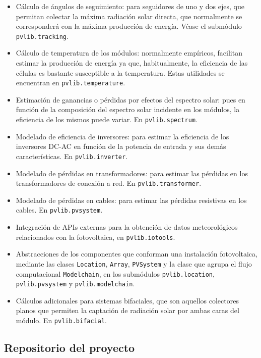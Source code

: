 \begin{itemize}
      \item Cálculo de ángulos de seguimiento: para seguidores de uno y dos ejes, que permitan colectar la máxima radiación solar directa, que normalmente se corresponderá con la máxima producción de energía. Véase el submódulo \texttt{pvlib.tracking}.
      \item Cálculo de temperatura de los módulos: normalmente empíricos, facilitan estimar la producción de energía ya que, habitualmente, la eficiencia de las células es bastante susceptible a la temperatura. Estas utilidades se encuentran en \texttt{pvlib.temperature}.
      \item Estimación de ganancias o pérdidas por efectos del espectro solar: pues en función de la composición del espectro solar incidente en los módulos, la eficiencia de los mismos puede variar. En \texttt{pvlib.spectrum}.
      \item Modelado de eficiencia de inversores: para estimar la eficiencia de los inversores DC-AC en función de la potencia de entrada y sus demás características. En \texttt{pvlib.inverter}.
      \item Modelado de pérdidas en transformadores: para estimar las pérdidas en los transformadores de conexión a red. En \texttt{pvlib.transformer}.
      \item Modelado de pérdidas en cables: para estimar las pérdidas resistivas en los cables. En \texttt{pvlib.pvsystem}.
      \item Integración de APIs externas para la obtención de datos meteorológicos relacionados con la fotovoltaica, en \texttt{pvlib.iotools}.
      \item Abstracciones de los componentes que conforman una instalación fotovoltaica, mediante las clases \texttt{Location}, \texttt{Array}, \texttt{PVSystem} y la clase que agrupa el flujo computacional \texttt{Modelchain}, en los submódulos \texttt{pvlib.location}, \texttt{pvlib.pvsystem} y \texttt{pvlib.modelchain}.
      \item Cálculos adicionales para sistemas bifaciales, que son aquellos colectores planos que permiten la captación de radiación solar por ambas caras del módulo. En \texttt{pvlib.bifacial}.

\end{itemize}

\subsection{Repositorio del proyecto} \label{ssct:pvlib:repositorio}

